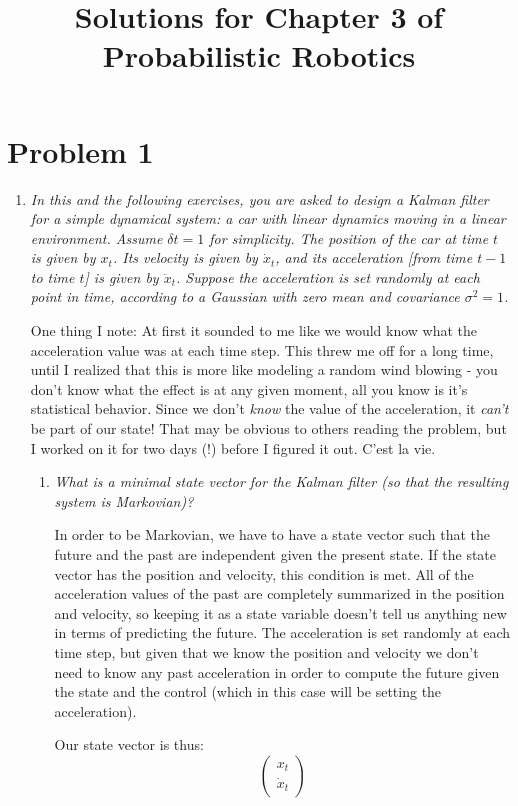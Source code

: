 \documentclass[10pt]{article}
\begin{document}
\title{Solutions for Chapter 3 of Probabilistic Robotics}

\section{Problem 1}
\begin{enumerate}
  \item \textit{In this and the following exercises, you are asked to design a Kalman
filter for a simple dynamical system: a car with linear dynamics moving in a
linear environment. Assume $\delta t = 1$ for simplicity. The position of the
car at time $t$ is given by $x_t$. Its velocity is given by $\dot{x}_t$, and its
acceleration [from time $t-1$ to time $t$] is given by $\ddot{x}_t$. Suppose the
acceleration is set randomly at each point in time, according to a Gaussian with
zero mean and covariance $\sigma^2 = 1$.}

One thing I note: At first it sounded to me like we would know what the
acceleration value was at each time step. This threw me off for a long time,
until I realized that this is more like modeling a random wind blowing - you
don't know what the effect is at any given moment, all you know is it's
statistical behavior. Since we don't \textit{know} the value of the
acceleration, it \textit{can't} be part of our state! That may be obvious to
others reading the problem, but I worked on it for two days (!) before I figured
it out. C'est la vie.

  \begin{enumerate}
  \item \textit{What is a minimal state vector for the Kalman filter (so that the
    resulting system is Markovian)?} 

    In order to be Markovian, we have to have a state vector such that the
    future and the past are independent given the present state. If the state
    vector has the position and velocity, this condition is met. All of the
    acceleration values of the past are completely summarized in the position
    and velocity, so keeping it as a state variable doesn't tell us anything new
    in terms of predicting the future. The acceleration is set randomly at each
    time step, but given that we know the position and velocity we don't need to
    know any past acceleration in order to compute the future given the state
    and the control (which in this case will be setting the acceleration).

    Our state vector is thus:
  $$\begin{pmatrix}x_t \\ \dot{x}_t\end{pmatrix}$$


\end{enumerate}
\end{enumerate}
\end{document}

